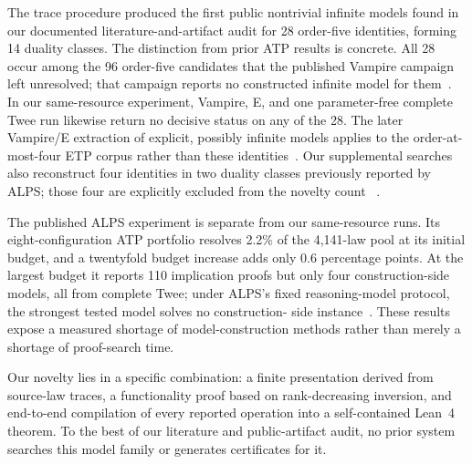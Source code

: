 \documentclass[runningheads]{llncs}
\begin{document}
The trace procedure produced the first public nontrivial infinite models found
in our documented literature-and-artifact audit for 28 order-five identities,
forming 14 duality classes.  The distinction from prior ATP results is
concrete.  All 28 occur among the 96 order-five candidates that the published
Vampire campaign left unresolved; that campaign reports no constructed
infinite model for them~\cite{ETPOrder5Austin}.  In our same-resource
experiment, Vampire, E, and one parameter-free complete Twee run likewise
return no decisive status on any of the 28.  The later Vampire/E extraction of
explicit, possibly infinite models applies to the order-at-most-four ETP corpus
rather than these identities~\cite{JanotaRawsonSchulz2026}.  Our supplemental
searches also reconstruct four identities in two duality classes previously
reported by ALPS; those four are explicitly excluded from the novelty count
~\cite{ALPSData2026,XieEtAl2026ALPS}.

The published ALPS experiment is separate from our same-resource runs.  Its
eight-configuration ATP portfolio resolves 2.2\% of the 4,141-law pool at its
initial budget, and a twentyfold budget increase adds only 0.6 percentage
points.  At the largest budget it reports 110 implication proofs but only four
construction-side models, all from complete Twee; under ALPS's fixed
reasoning-model protocol, the strongest tested model solves no construction-
side instance~\cite{XieEtAl2026ALPS}.  These results expose a measured shortage
of model-construction methods rather than merely a shortage of proof-search
time.

Our novelty lies in a specific combination: a finite presentation derived
from source-law traces, a functionality proof based on rank-decreasing
inversion, and end-to-end compilation of every reported operation into a
self-contained Lean~4 theorem.  To the best of our literature and
public-artifact audit, no prior system searches this model family or generates
certificates for it.
\end{document}
